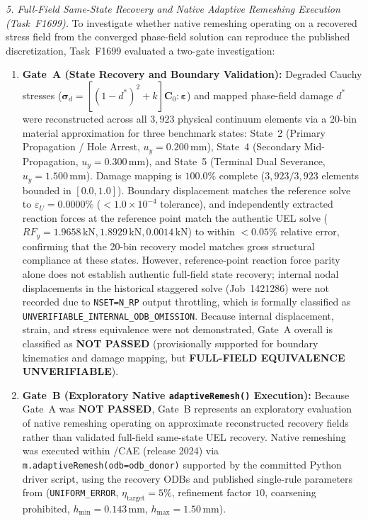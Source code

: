 \textit{5. Full-Field Same-State Recovery and Native Adaptive Remeshing Execution (Task~F1699).}
To investigate whether native \Abaqus remeshing operating on a recovered stress field from the converged phase-field solution can reproduce the published discretization, Task~F1699 evaluated a two-gate investigation:
\begin{enumerate}
  \item \textbf{Gate~A (State Recovery and Boundary Validation):}
  Degraded Cauchy stresses ($\boldsymbol{\sigma}_d = [(1-d^*)^2 + k] \mathbf{C}_0 : \boldsymbol{\varepsilon}$) and mapped phase-field damage $d^*$ were reconstructed across all $3{,}923$ physical continuum elements via a 20-bin material approximation for three benchmark states: State~2 (Primary Propagation / Hole Arrest, $u_y = 0.200\,\mathrm{mm}$), State~4 (Secondary Mid-Propagation, $u_y = 0.300\,\mathrm{mm}$), and State~5 (Terminal Dual Severance, $u_y = 1.500\,\mathrm{mm}$). Damage mapping is $100.0\%$ complete ($3{,}923/3{,}923$ elements bounded in $[0.0, 1.0]$). Boundary displacement matches the reference solve to $\varepsilon_U = 0.0000\%$ ($< 1.0 \times 10^{-4}$ tolerance), and independently extracted reaction forces at the reference point match the authentic UEL solve ($RF_y = 1.9658\,\mathrm{kN}, 1.8929\,\mathrm{kN}, 0.0014\,\mathrm{kN}$) to within $< 0.05\%$ relative error, confirming that the 20-bin recovery model matches gross structural compliance at these states. However, reference-point reaction force parity alone does not establish authentic full-field state recovery; internal nodal displacements in the historical staggered solve (Job~1421286) were not recorded due to \texttt{NSET=N\_RP} output throttling, which is formally classified as \texttt{UNVERIFIABLE\_INTERNAL\_ODB\_OMISSION}. Because internal displacement, strain, and stress equivalence were not demonstrated, Gate~A overall is classified as \textbf{NOT PASSED} (provisionally supported for boundary kinematics and damage mapping, but \textbf{FULL-FIELD EQUIVALENCE UNVERIFIABLE}).
  \item \textbf{Gate~B (Exploratory Native \Abaqus \texttt{adaptiveRemesh()} Execution):}
  Because Gate~A was \textbf{NOT PASSED}, Gate~B represents an exploratory evaluation of native remeshing operating on approximate reconstructed recovery fields rather than validated full-field same-state UEL recovery. Native remeshing was executed within \Abaqus/CAE (release 2024) via \texttt{m.adaptiveRemesh(odb=odb\_donor)} supported by the committed Python driver script, using the recovery ODBs and published single-rule parameters from \citet[Listing~1]{pandey2025} (\texttt{UNIFORM\_ERROR}, $\eta_{\mathrm{target}} = 5\%$, refinement factor $10$, coarsening prohibited, $h_{\min} = 0.143\,\mathrm{mm}$, $h_{\max} = 1.50\,\mathrm{mm}$).

\end{enumerate}
